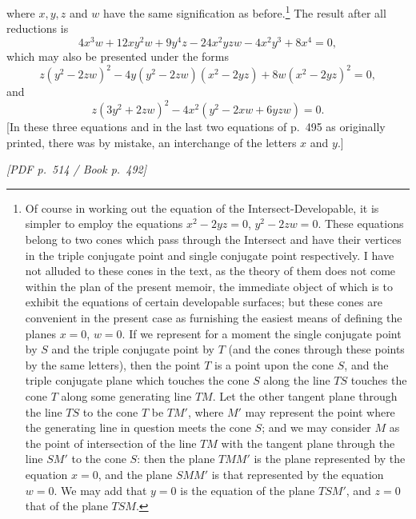\documentclass[11pt]{article}
\newcommand{\Page}[2]{\bigskip\noindent\textit{[PDF p.~#1 / Book p.~#2]}\par\smallskip}
\begin{document}
where $x,y,z$ and $w$ have the same signification as before.\footnote{Of course in
working out the equation of the Intersect-Developable, it is simpler to employ the
equations $x^2-2yz=0$, $y^2-2zw=0$. These equations belong to two cones which pass
through the Intersect and have their vertices in the triple conjugate point and single
conjugate point respectively. I have not alluded to these cones in the text, as the
theory of them does not come within the plan of the present memoir, the immediate
object of which is to exhibit the equations of certain developable surfaces; but these
cones are convenient in the present case as furnishing the easiest means of defining
the planes $x=0$, $w=0$. If we represent for a moment the single conjugate point by
$S$ and the triple conjugate point by $T$ (and the cones through these points by the
same letters), then the point $T$ is a point upon the cone $S$, and the triple
conjugate plane which touches the cone $S$ along the line $TS$ touches the cone $T$
along some generating line $TM$. Let the other tangent plane through the line $TS$
to the cone $T$ be $TM'$, where $M'$ may represent the point where the generating
line in question meets the cone $S$; and we may consider $M$ as the point of
intersection of the line $TM$ with the tangent plane through the line $SM'$ to the
cone $S$: then the plane $TMM'$ is the plane represented by the equation $x=0$,
and the plane $SMM'$ is that represented by the equation $w=0$. We may add that
$y=0$ is the equation of the plane $TSM'$, and $z=0$ that of the plane $TSM$.}
The result after all reductions is
\[
        4x^3w+12xy^2w+9y^4z-24x^2yzw-4x^2y^3+8x^4=0,
\]
which may also be presented under the forms
\[
        z(y^2-2zw)^2-4y(y^2-2zw)(x^2-2yz)+8w(x^2-2yz)^2=0,
\]
and
\[
        z(3y^2+2zw)^2-4x^2(y^2-2xw+6yzw)=0.
\]
[In these three equations and in the last two equations of p.~495 as originally
printed, there was by mistake, an interchange of the letters $x$ and $y$.]

\Page{514}{492}
\end{document}
